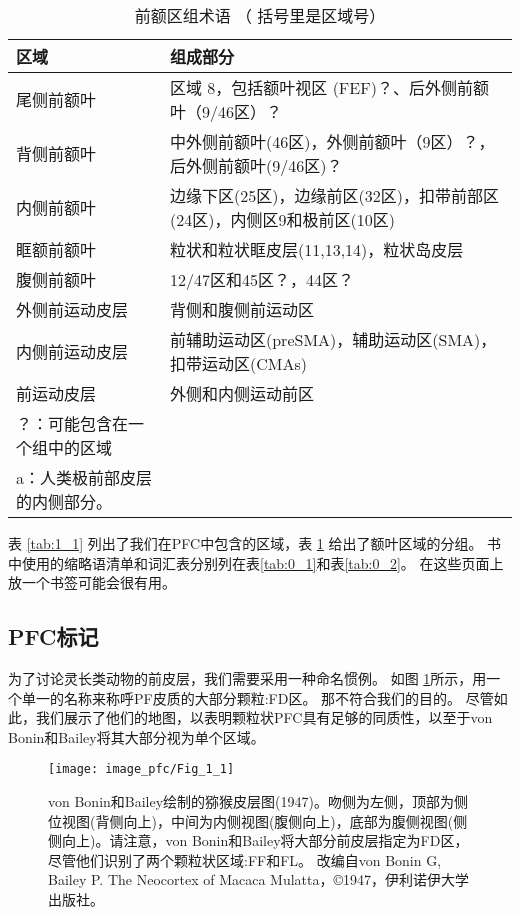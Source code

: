 \begin{table}[htbp] 
	\newcommand{\tabincell}[2]{\begin{tabular}{@{}#1@{}}#2\end{tabular}} %
	\centering
	\caption{前额区组术语 （ 括号里是区域号）\label{tab:1_2}}
	\renewcommand\arraystretch{1.5}	%
	\begin{tabular}{ll}
		\toprule
		区域 & 组成部分 \\
		\midrule
		尾侧前额叶 & 区域 8，包括额叶视区 (FEF)？、后外侧前额叶（9/46区）？  \\
		背侧前额叶 & 中外侧前额叶(46区)，外侧前额叶（9区）？，后外侧前额叶(9/46区)？ \\
		内侧前额叶&边缘下区(25区)，边缘前区(32区)，扣带前部区(24区)，内侧区9和极前区(10区)  \\
		眶额前额叶 & 粒状和粒状眶皮层(11,13,14)，粒状岛皮层  \\
		腹侧前额叶&12/47区和45区？，44区？ \\
		外侧前运动皮层 & 背侧和腹侧前运动区\\
		内侧前运动皮层 & 前辅助运动区(preSMA)，辅助运动区(SMA)，扣带运动区(CMAs)  \\
		前运动皮层 & 外侧和内侧运动前区  \\
		\bottomrule
	\par？：可能包含在一个组中的区域\\
		\par a：人类极前部皮层的内侧部分。
	\end{tabular}%
\end{table}%


\par
表 \ref{tab:1_1} 列出了我们在PFC中包含的区域，表 \ref{tab:1_2} 给出了额叶区域的分组。
书中使用的缩略语清单和词汇表分别列在表\ref{tab:0_1}和表\ref{tab:0_2}。
在这些页面上放一个书签可能会很有用。


\subsection{PFC标记}
为了讨论灵长类动物的前皮层，我们需要采用一种命名惯例。
如图 \ref{fig:1_1}所示，用一个单一的名称来称呼PF皮质的大部分颗粒:FD区\cite{von1947neocortex}。
那不符合我们的目的。
尽管如此，我们展示了他们的地图，以表明颗粒状PFC具有足够的同质性，以至于von Bonin和Bailey将其大部分视为单个区域。

\begin{figure}[!htb]
	\centering
	\texttt{[image: image\_pfc/Fig\_1\_1]}
	\caption{von Bonin和Bailey绘制的猕猴皮层图(1947)。吻侧为左侧，顶部为侧位视图(背侧向上)，中间为内侧视图(腹侧向上)，底部为腹侧视图(侧侧向上)。请注意，von Bonin和Bailey将大部分前皮层指定为FD区，尽管他们识别了两个颗粒状区域:FF和FL。
		改编自von Bonin G, Bailey P. The Neocortex of Macaca Mulatta，©1947，伊利诺伊大学出版社。\label{fig:1_1}}
\end{figure}


